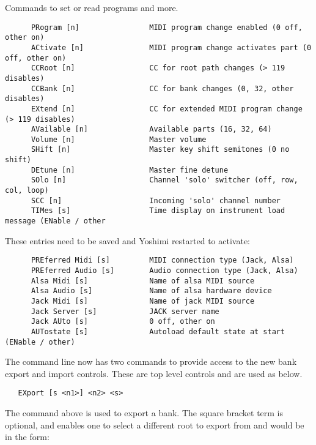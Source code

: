    Commands to set or read programs and more.

\begin{verbatim}
      PRogram [n]                MIDI program change enabled (0 off, other on)
      ACtivate [n]               MIDI program change activates part (0 off, other on)
      CCRoot [n]                 CC for root path changes (> 119 disables)
      CCBank [n]                 CC for bank changes (0, 32, other disables)
      EXtend [n]                 CC for extended MIDI program change (> 119 disables)
      AVailable [n]              Available parts (16, 32, 64)
      Volume [n]                 Master volume
      SHift [n]                  Master key shift semitones (0 no shift)
      DEtune [n]                 Master fine detune
      SOlo [n]                   Channel 'solo' switcher (off, row, col, loop)
      SCC [n]                    Incoming 'solo' channel number
      TIMes [s]                  Time display on instrument load message (ENable / other
\end{verbatim}

      These entries need to be saved and Yoshimi restarted to activate:

\begin{verbatim}
      PREferred Midi [s]         MIDI connection type (Jack, Alsa)
      PREferred Audio [s]        Audio connection type (Jack, Alsa)
      Alsa Midi [s]              Name of alsa MIDI source
      Alsa Audio [s]             Name of alsa hardware device
      Jack Midi [s]              Name of jack MIDI source
      Jack Server [s]            JACK server name
      Jack AUto [s]              0 off, other on
      AUTostate [s]              Autoload default state at start (ENable / other)
\end{verbatim}

\fi


   The command line now has two commands to provide access to the new bank
   export and import controls. These are top level controls and are used as
   below.

\begin{verbatim}
   EXport [s <n1>] <n2> <s>
\end{verbatim}

   The command above is used to export a bank. The square bracket term is
   optional, and enables one to select a different root to export from and
   would be in the form:

